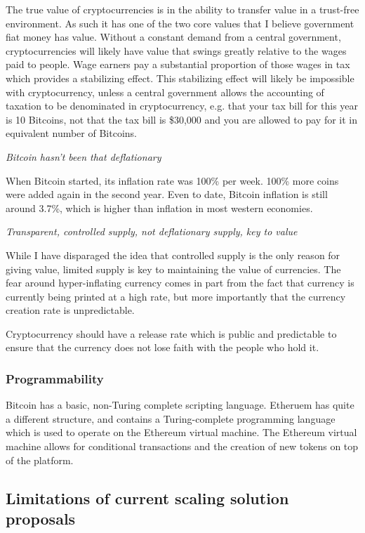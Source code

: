 \documentclass[a4paper,12pt]{article}
\begin{document}
The true value of cryptocurrencies is in the ability to transfer value in a trust-free environment. As such it has one of the two core values that I believe government fiat money has value. Without a constant demand from a central government, cryptocurrencies will likely have value that swings greatly relative to the wages paid to people. Wage earners pay a substantial proportion of those wages in tax which provides a stabilizing effect. This stabilizing effect will likely be impossible with cryptocurrency, unless a central government allows the accounting of taxation to be denominated in cryptocurrency, e.g. that your tax bill for this year is 10 Bitcoins, not that the tax bill is \$30,000 and you are allowed to pay for it in equivalent number of Bitcoins.

\textit{Bitcoin hasn't been that deflationary}

When Bitcoin started, its inflation rate was 100\% per week. 100\% more coins were added again in the second year. Even to date, Bitcoin inflation is still around 3.7\%, which is higher than inflation in most western economies.

\textit{Transparent, controlled supply, not deflationary supply, key to value}

While I have disparaged the idea that controlled supply is the only reason for giving value, limited supply is key to maintaining the value of currencies. The fear around hyper-inflating currency comes in part from the fact that currency is currently being printed at a high rate, but more importantly that the currency creation rate is unpredictable. 

Cryptocurrency should have a release rate which is public and predictable to ensure that the currency does not lose faith with the people who hold it. 

\subsubsection{Programmability}
Bitcoin has a basic, non-Turing complete scripting language. Etheruem has quite a different structure, and contains a Turing-complete programming language which is used to operate on the Ethereum virtual machine. The Ethereum virtual machine allows for conditional transactions and the creation of new tokens on top of the platform. 

\subsection{Limitations of current scaling solution proposals}
\end{document}
